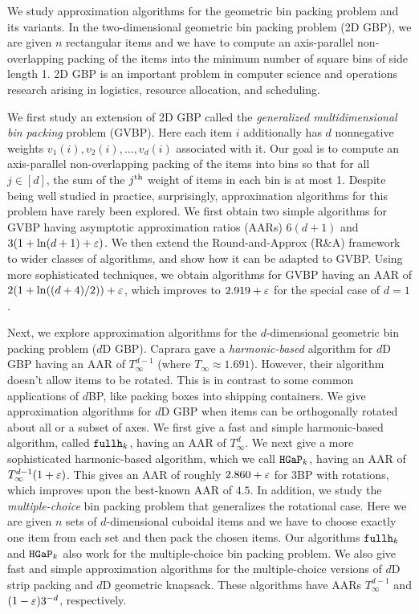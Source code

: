 We study approximation algorithms for
the geometric bin packing problem and its variants.
In the two-dimensional geometric bin packing problem (2D GBP),
we are given $n$ rectangular items and we have to compute
an axis-parallel non-overlapping packing
of the items into the minimum number of square bins of side length 1.
2D GBP is an important problem in computer science and operations research
arising in logistics, resource allocation, and scheduling.

We first study an extension of 2D GBP called the
\emph{generalized multidimensional bin packing} problem (GVBP).
Here each item $i$ additionally has $d$ nonnegative weights
$v_1(i), v_2(i), \ldots, v_d(i)$ associated with it.
Our goal is to compute an axis-parallel non-overlapping packing of the items into bins so that
for all $j \in [d]$, the sum of the $j^{\textrm{th}}$ weight of items in each bin is at most 1.
Despite being well studied in practice, surprisingly,
approximation algorithms for this problem have rarely been explored.
We first obtain two simple algorithms for GVBP having asymptotic approximation ratios (AARs)
$6(d+1)$ and $3(1 + \ln(d+1) + \varepsilon)$.
We then extend the Round-and-Approx (R\&A) framework
to wider classes of algorithms, and show how it can be adapted to GVBP.
Using more sophisticated techniques, we obtain algorithms for GVBP having
an AAR of $2(1+\ln((d+4)/2))+\varepsilon$,
which improves to $2.919+\varepsilon$ for the special case of $d=1$.

Next, we explore approximation algorithms for the $d$-dimensional
geometric bin packing problem ($d$D GBP).
Caprara 
gave a \emph{harmonic-based} algorithm for $d$D GBP having an AAR of
\texorpdfstring{$T_{\infty}^{d-1}$ (where $T_{\infty} \approx 1.691$)}{1.69104^(d-1)}.
However, their algorithm doesn't allow items to be rotated.
This is in contrast to some common applications of $d$BP,
like packing boxes into shipping containers.
We give approximation algorithms for $d$D GBP when items can be
orthogonally rotated about all or a subset of axes.
We first give a fast and simple harmonic-based algorithm,
called \texorpdfstring{$\operatorname{\mathtt{fullh}}_{k}$}{fullh\_k}, having an AAR of
\texorpdfstring{$T_{\infty}^{d}$}{1.69104^d}.
We next give a more sophisticated harmonic-based algorithm,
which we call \texorpdfstring{$\operatorname{\mathtt{HGaP}}_{k}$}{hgap\_k},
having an AAR of \texorpdfstring{$T_{\infty}^{d-1}(1+\varepsilon)$}{(1+eps)1.69104^(d-1)}.
This gives an AAR of roughly $2.860 + \varepsilon$ for 3BP with rotations,
which improves upon the best-known AAR of $4.5$.
In addition, we study the \emph{multiple-choice} bin packing problem
that generalizes the rotational case.
Here we are given $n$ sets of $d$-dimensional cuboidal items and we have to
choose exactly one item from each set and then pack the chosen items.
Our algorithms \texorpdfstring{$\operatorname{\mathtt{fullh}}_{k}$}{fullh\_k} and \texorpdfstring{$\operatorname{\mathtt{HGaP}}_{k}$}{hgap\_k}
also work for the multiple-choice bin packing problem.
We also give fast and simple approximation algorithms for the multiple-choice
versions of $d$D strip packing and $d$D geometric knapsack.
These algorithms have AARs
\texorpdfstring{$T_{\infty}^{d-1}$}{1.69104^(d-1)} and $(1-\varepsilon)3^{-d}$, respectively.

